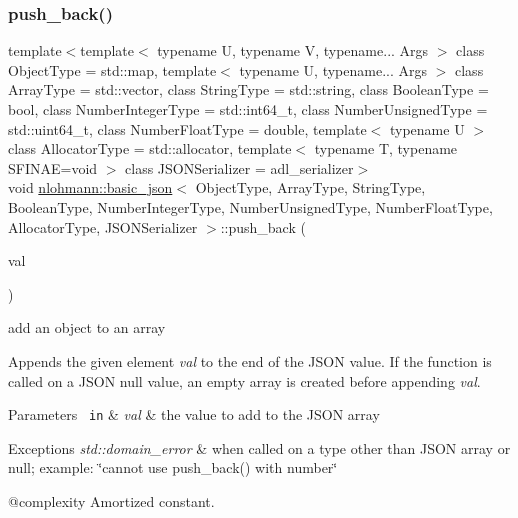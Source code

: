 \subsubsection{\texorpdfstring{push\_back()}{push\_back()}\hspace{0.1cm}{\footnotesize\ttfamily [1/4]}}
{\footnotesize\ttfamily template$<$template$<$ typename U, typename V, typename... Args $>$ class Object\+Type = std\+::map, template$<$ typename U, typename... Args $>$ class Array\+Type = std\+::vector, class String\+Type  = std\+::string, class Boolean\+Type  = bool, class Number\+Integer\+Type  = std\+::int64\+\_\+t, class Number\+Unsigned\+Type  = std\+::uint64\+\_\+t, class Number\+Float\+Type  = double, template$<$ typename U $>$ class Allocator\+Type = std\+::allocator, template$<$ typename T, typename S\+F\+I\+N\+A\+E=void $>$ class J\+S\+O\+N\+Serializer = adl\+\_\+serializer$>$ \\
void \mbox{\hyperlink{classnlohmann_1_1basic__json}{nlohmann\+::basic\+\_\+json}}$<$ Object\+Type, Array\+Type, String\+Type, Boolean\+Type, Number\+Integer\+Type, Number\+Unsigned\+Type, Number\+Float\+Type, Allocator\+Type, J\+S\+O\+N\+Serializer $>$\+::push\+\_\+back (\begin{DoxyParamCaption}\item[{\mbox{\hyperlink{classnlohmann_1_1basic__json}{basic\+\_\+json}}$<$ Object\+Type, Array\+Type, String\+Type, Boolean\+Type, Number\+Integer\+Type, Number\+Unsigned\+Type, Number\+Float\+Type, Allocator\+Type, J\+S\+O\+N\+Serializer $>$ \&\&}]{val }\end{DoxyParamCaption})\hspace{0.3cm}{\ttfamily [inline]}}



add an object to an array 

Appends the given element {\itshape val} to the end of the J\+S\+ON value. If the function is called on a J\+S\+ON null value, an empty array is created before appending {\itshape val}.


\begin{DoxyParams}[1]{Parameters}
\mbox{\texttt{ in}}  & {\em val} & the value to add to the J\+S\+ON array\\
\hline
\end{DoxyParams}

\begin{DoxyExceptions}{Exceptions}
{\em std\+::domain\+\_\+error} & when called on a type other than J\+S\+ON array or null; example\+: {\ttfamily \char`\"{}cannot use push\+\_\+back() with number\char`\"{}}\\
\hline
\end{DoxyExceptions}
@complexity Amortized constant.

